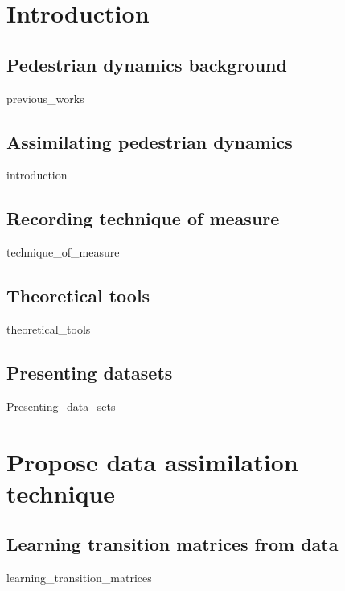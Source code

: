 \documentclass[10pt,a4paper]{report}
\begin{document}

\begin{abstract}
	{abstract}
\end{abstract}



\tableofcontents



\chapter{Introduction}

\FloatBarrier
\section{Pedestrian dynamics background}
	{previous_works}

\FloatBarrier
\section{Assimilating pedestrian dynamics}
	{introduction}

\FloatBarrier
\section{Recording technique of measure}
	{technique_of_measure}

\FloatBarrier
\section{Theoretical tools}
	{theoretical_tools}

\FloatBarrier
\section{Presenting datasets}
	{Presenting_data_sets}



\chapter{Propose data assimilation technique}

\FloatBarrier
\section{Learning transition matrices from data}
	{learning_transition_matrices}
\end{document}
